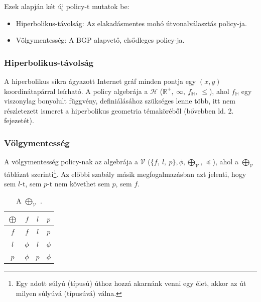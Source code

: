   Ezek alapján két új policy-t mutatok be:

  \begin{itemize}
    \item Hiperbolikus-távolság: Az elakadásmentes mohó útvonalválasztás policy-ja.
    \item Völgymentesség: A BGP alapvető, elsődleges policy-ja.
  \end{itemize}

      \subsubsection{Hiperbolikus-távolság}

      A hiperbolikus síkra ágyazott Internet gráf minden pontja egy $(x,y)$ koordinátapárral leírható. A policy algebrája a $\mathcal{H}$ ($\mathbb{R}^{+},~\infty,~f_{\mathbb{H}},~\leq$), ahol $f_{\mathbb{H}}$ egy viszonylag bonyolult függvény, definiálásához szükséges lenne több, itt nem részletezett ismeret a hiperbolikus geometria témaköréből (bővebben ld. \cite{Thurston97} 2. fejezetét).

      \subsubsection{Völgymentesség}

      A völgymentesség policy-nak az algebrája a $\mathcal{V}$ ($\{f,~l,~p\},\phi,\bigoplus_{\mathcal{V}},\preceq$),  ahol a $\bigoplus_{\mathcal{V}}$  táblázat szerinti\footnote{ Egy adott súlyú (típusú) úthoz hozzá akarnánk venni egy élet, akkor az út milyen súlyúvá (típusúvá) válna.}. Az előbbi szabály másik megfogalmazásban azt jelenti, hogy sem $l$-t, sem $p$-t nem követhet sem $p$, sem $f$.

      \begin{table}[ht]
        \footnotesize
        \centering
        \caption{A $\bigoplus_{\mathcal{V}}$ \cite{Compact_Policy_Routing}.}
        \begin{tabular}{ c | c c c }
          $\bigoplus$ & $f$ & $l$ & $p$\\
          \hline
          $f$ & $f$ & $l$ & $p$\\
          $l$ & $\phi$ & $l$ & $\phi$\\
          $p$ & $\phi$ & $p$ & $\phi$\\
        \end{tabular}\label{tab:szumma_tab}
      \end{table}\newpage

